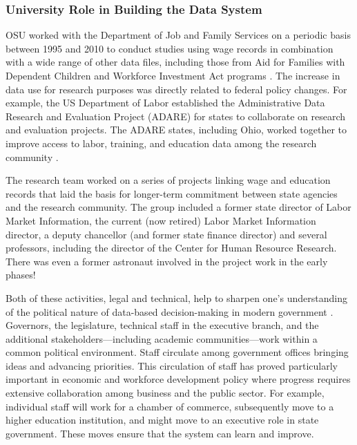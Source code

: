 \documentclass[
]{book}
\begin{document}
\hypertarget{university-role-in-building-the-data-system}{%
\subsubsection*{University Role in Building the Data System}\label{university-role-in-building-the-data-system}}

OSU worked with the Department of Job and Family Services on a periodic basis between 1995 and 2010 to conduct studies using wage records in combination with a wide range of other data files, including those from Aid for Families with Dependent Children and Workforce Investment Act programs \citep{centerforhumanresourceresearch2001}. The increase in data use for research purposes was directly related to federal policy changes. For example, the US Department of Labor established the Administrative Data Research and Evaluation Project (ADARE) for states to collaborate on research and evaluation projects. The ADARE states, including Ohio, worked together to improve access to labor, training, and education data among the research community \citep{stevens2012}.

The research team worked on a series of projects linking wage and education records that laid the basis for longer-term commitment between state agencies and the research community. The group included a former state director of Labor Market Information, the current (now retired) Labor Market Information director, a deputy chancellor (and former state finance director) and several professors, including the director of the Center for Human Resource Research. There was even a former astronaut involved in the project work in the early phases!

Both of these activities, legal and technical, help to sharpen one's understanding of the political nature of data-based decision-making in modern government \citep{stone2012}. Governors, the legislature, technical staff in the executive branch, and the additional stakeholders---including academic communities---work within a common political environment. Staff circulate among government offices bringing ideas and advancing priorities. This circulation of staff has proved particularly important in economic and workforce development policy where progress requires extensive collaboration among business and the public sector. For example, individual staff will work for a chamber of commerce, subsequently move to a higher education institution, and might move to an executive role in state government. These moves ensure that the system can learn and improve.
\end{document}
